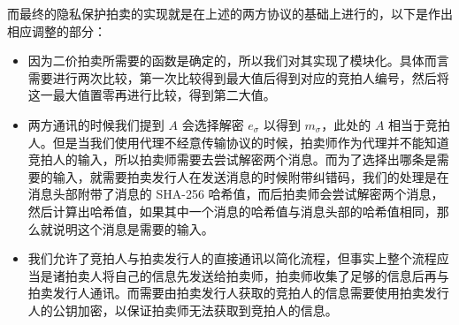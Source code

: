 而最终的隐私保护拍卖的实现就是在上述的两方协议的基础上进行的，以下是作出相应调整的部分：

\begin{itemize}
    \item 因为二价拍卖所需要的函数是确定的，所以我们对其实现了模块化。具体而言需要进行两次比较，第一次比较得到最大值后得到对应的竞拍人编号，然后将这一最大值置零再进行比较，得到第二大值。
    \item 两方通讯的时候我们提到 $A$ 会选择解密 $e_{\sigma}$ 以得到 $m_{\sigma}$，此处的 $A$ 相当于竞拍人。但是当我们使用代理不经意传输协议的时候，拍卖师作为代理并不能知道竞拍人的输入，所以拍卖师需要去尝试解密两个消息。而为了选择出哪条是需要的输入，就需要拍卖发行人在发送消息的时候附带纠错码，我们的处理是在消息头部附带了消息的 SHA-256 哈希值，而后拍卖师会尝试解密两个消息，然后计算出哈希值，如果其中一个消息的哈希值与消息头部的哈希值相同，那么就说明这个消息是需要的输入。
    \item 我们允许了竞拍人与拍卖发行人的直接通讯以简化流程，但事实上整个流程应当是诸拍卖人将自己的信息先发送给拍卖师，拍卖师收集了足够的信息后再与拍卖发行人通讯。而需要由拍卖发行人获取的竞拍人的信息需要使用拍卖发行人的公钥加密，以保证拍卖师无法获取到竞拍人的信息。
\end{itemize}
